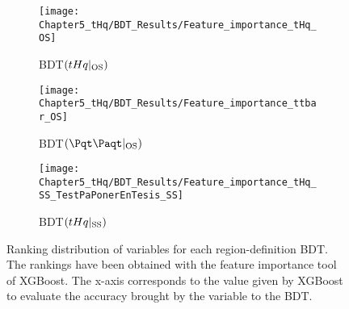 \begin{figure}[h]
  \centering  
  \begin{subfigure}[b]{0.49\textwidth}
    \centering
    \texttt{[image: Chapter5\_tHq/BDT\_Results/Feature\_importance\_tHq\_OS]}
    \caption{BDT$(tHq|_{\text{OS}})$}
     \label{fig:ChaptH:EventSelection:BDT:Rankings:tHqOS}
  \end{subfigure}
  \hfill
  \begin{subfigure}[b]{0.49\textwidth}
    \centering
    \texttt{[image: Chapter5\_tHq/BDT\_Results/Feature\_importance\_ttbar\_OS]}
    \caption{BDT$(\ttbar|_{\text{OS}})$}
     \label{fig:ChaptH:EventSelection:BDT:Rankings:ttbarOS}
  \end{subfigure}
    \hfill
  \begin{subfigure}[b]{0.49\textwidth}
    \centering
    \texttt{[image: Chapter5\_tHq/BDT\_Results/Feature\_importance\_tHq\_SS\_TestPaPonerEnTesis\_SS]}
    \caption{BDT$(tHq|_{\text{SS}})$}
     \label{fig:ChaptH:EventSelection:BDT:Rankings:tHqSS}
  \end{subfigure}
  \caption{Ranking distribution of variables for each region-definition BDT. The rankings have been obtained 
  with the feature importance tool of XGBoost. The x-axis corresponds to the value given by XGBoost to 
  evaluate the accuracy brought by the variable to the BDT.} %
  \label{fig:ChaptH:EventSelection:BDT:Rankings}
\end{figure}



